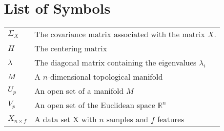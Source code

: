 \chapter*{List of Symbols}

\begin{table}[htbp]
	\begin{tabularx}{\textwidth}{XX}
		$\Sigma_X$ & The covariance matrix associated with the matrix $X$. \bigstrut\\
		$H$ & The centering matrix \bigstrut \\
		$\lambda$ & The diagonal matrix containing the eigenvalues $\lambda_i$ \bigstrut\\
		$M$ & A $n$-dimensional topological manifold \bigstrut\\
		$U_p$ & An open set of a manifold $M$ \bigstrut\\
		$V_p$ & An open set of the Euclidean space $\mathbb{R}^n$ \bigstrut\\
		$X_{n \times f}$ & A data set X with $n$ samples and $f$ features \bigstrut\\
	\end{tabularx}
\end{table}
